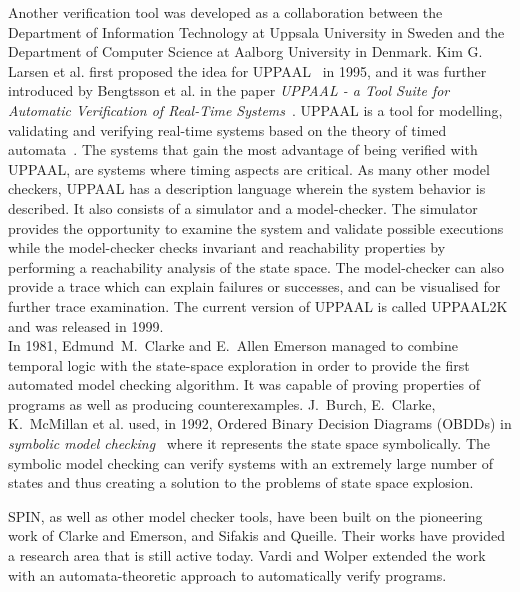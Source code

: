 Another verification tool was developed as a collaboration between the Department of Information Technology at Uppsala University in Sweden and the Department of Computer Science at Aalborg University in Denmark. Kim G. Larsen et al. first proposed the idea for UPPAAL~\cite{Larsen1995} in 1995, and it was further introduced by Bengtsson et al. in the paper \textit{UPPAAL - a Tool Suite for Automatic Verification of Real-Time Systems}~\cite{Bengtsson1995}.
UPPAAL is a tool for modelling, validating and verifying real-time systems based on the theory of timed automata~\cite{Hopcroft2001, Alur1990}.
The systems that gain the most advantage of being verified with UPPAAL, are systems where timing aspects are critical.
As many other model checkers, UPPAAL has a description language wherein the system behavior is described. It also consists of a simulator and a model-checker. The simulator provides the opportunity to examine the system and validate possible executions while the model-checker checks invariant and reachability properties by performing a reachability analysis of the state space. The model-checker can also provide a trace which can explain failures or successes, and can be visualised for further trace examination.
The current version of UPPAAL is called UPPAAL2K and was released in 1999\cite{Amnell2001}.\\

In 1981, Edmund~M.~Clarke and E.~Allen Emerson managed to combine temporal logic with the state-space exploration in order to provide the first automated model checking algorithm\cite{Clarke1981}. It was capable of proving properties of programs as well as producing counterexamples.
J.~Burch, E.~Clarke, K.~McMillan et al. used, in 1992, Ordered Binary Decision Diagrams (OBDDs) in \textit{symbolic model checking}~\cite{Burch1992} where it represents the state space symbolically. The symbolic model checking can verify systems with an extremely large number of states and thus creating a solution to the problems of state space explosion.

SPIN, as well as other model checker tools, have been built on the pioneering work of Clarke and Emerson\cite{Clarke1981}, and Sifakis and Queille\cite{Queille1982}. Their works have provided a research area that is still active today. Vardi and Wolper extended the work with an automata-theoretic approach to automatically verify programs\cite{Vardi1986}.\\

